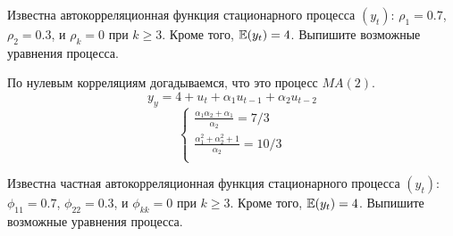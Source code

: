\begin{problem}
  Известна автокорреляционная функция стационарного процесса $(y_t)$: $\rho_1 = 0.7$, $\rho_2 = 0.3$, и $\rho_k = 0$ при $k\geq 3$. 
  Кроме того, $\operatorname{\mathbb{E}}(y_t)=4$. 
  Выпишите возможные уравнения процесса.
\begin{sol}
По нулевым корреляциям догадываемся, что это процесс $MA(2)$.
\[
y_y = 4 + u_t + \alpha_1 u_{t-1} + \alpha_2 u_{t-2}
\]
\[
\begin{cases}
  \frac{\alpha_1 \alpha_2 + \alpha_1}{\alpha_2} = 7/3 \\
  \frac{\alpha_1^2 + \alpha_2^2 + 1}{\alpha_2} = 10/3 \\
\end{cases}
\]


\end{sol}
\end{problem}

\begin{problem}
  Известна частная автокорреляционная функция стационарного процесса $(y_t)$: $\phi_{11} = 0.7$, $\phi_{22} = 0.3$, и $\phi_{kk} = 0$ при $k\geq 3$. Кроме того, $\operatorname{\mathbb{E}}(y_t)=4$. Выпишите возможные уравнения процесса.
\begin{sol}
\end{sol}
\end{problem}

